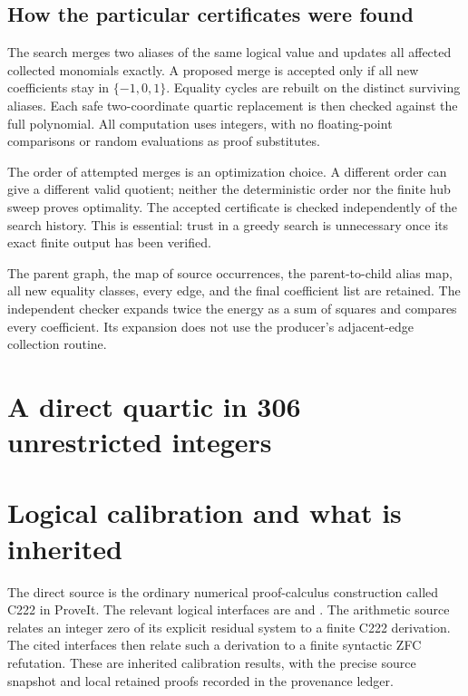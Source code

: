 \documentclass[11pt,letterpaper]{article}
\theoremstyle{definition}\newtheorem{definition}[theorem]{Definition}
\theoremstyle{remark}\newtheorem{remark}[theorem]{Remark}
\begin{document}
\subsection{How the particular certificates were found}

The search merges two aliases of the same logical value and updates all
affected collected monomials exactly. A proposed merge is accepted only if
all new coefficients stay in $\{-1,0,1\}$. Equality cycles are rebuilt
on the distinct surviving aliases. Each safe two-coordinate quartic
replacement is then checked against the full polynomial. All computation
uses integers, with no floating-point comparisons or random evaluations
as proof substitutes.

The order of attempted merges is an optimization choice. A different order
can give a different valid quotient; neither the deterministic order nor
the finite hub sweep proves optimality. The accepted certificate is checked
independently of the search history. This is essential: trust in a greedy
search is unnecessary once its exact finite output has been verified.

The parent graph, the map of source occurrences, the parent-to-child alias
map, all new equality classes, every edge, and the final coefficient list
are retained. The independent checker expands twice the energy as a sum
of squares and compares every coefficient. Its expansion does not use the
producer's adjacent-edge collection routine.

\clearpage
\section{A direct quartic in 306 unrestricted integers}
\label{sec:signed}


\section{Logical calibration and what is inherited}
\label{sec:calibration}

The direct source is the ordinary numerical proof-calculus construction
called C222 in ProveIt. The relevant logical interfaces are
 and
.
The arithmetic source relates an integer zero of its explicit residual
system to a finite C222 derivation. The cited interfaces then relate such
a derivation to a finite syntactic ZFC refutation. These are inherited
calibration results, with the precise source snapshot and local retained
proofs recorded in the provenance ledger.
\end{document}
